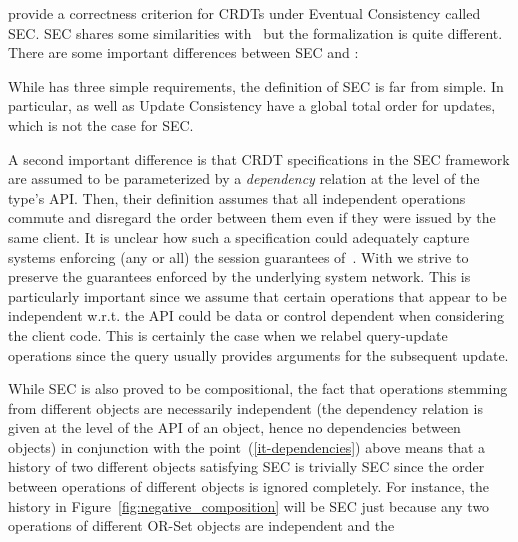 \citet{JagadeesanR18} provide a correctness criterion for CRDTs under
Eventual Consistency called SEC.
%
SEC shares some similarities with~\cite{PerrinMJ14} but the
formalization is quite different.
There are some important differences between SEC and \CRDTLinshort{}:
\begin{inparaenum}
\item While \CRDTLinshort{} has three simple requirements, the
  definition of SEC is far from simple.
  In particular, \CRDTLinshort{} as well as Update Consistency have a
  global total order for updates, which is not the case for
  SEC. %
\item
  \label{it-dependencies}
  A second important difference is that CRDT
  specifications in the SEC framework are assumed to be parameterized by a \emph{dependency}
  relation at the level of the type's API.
  Then, their definition assumes that all independent operations
  commute %
  and disregard the order between them even if they were issued by the same client.
  It is unclear how such a specification could adequately capture
  systems enforcing (any or all) the session guarantees
  of~\cite{TerryDPSTW94}.
  With \CRDTLinshort{} we strive to preserve the guarantees enforced by the
  underlying system network.
  This is particularly important since we assume that certain
  operations that appear to be independent w.r.t. the API could be
  data or control dependent when considering the client code.
  This is certainly the case when we relabel query-update operations
  since the query usually provides arguments for the subsequent
  update.
\item While SEC is also proved to be compositional,
  the
  fact that operations stemming from different objects are necessarily
  independent (the dependency relation is given at the level of the API
  of an object, hence no dependencies between objects) in conjunction
  with the point~(\ref{it-dependencies}) above means that a history of
  two different objects satisfying SEC is trivially SEC since the order between
  operations of different objects is ignored completely. For instance, the
  history in Figure~\ref{fig:negative_composition} will be SEC just because
  any two operations of different OR-Set objects are independent and the

\end{inparaenum}
